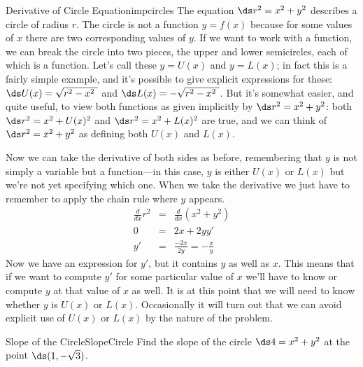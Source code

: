 \begin{example}{Derivative of Circle Equation}{impcircles}
The equation $\ds r^2=x^2+y^2$
describes a circle of radius $r$. The circle is not a function
$y=f(x)$ because for some values of $x$ there are two corresponding
values of $y$. If we want to work with a function, we can break the
circle into two pieces, the upper and lower semicircles, each of which
is a function. Let's call these $y=U(x)$ and $y=L(x)$; in fact this is
a fairly simple example, and it's possible to give explicit
expressions for these: $\ds U(x)=\sqrt{r^2-x^2\ }$ and
$\ds L(x)=-\sqrt{r^2-x^2\ }$.  But it's somewhat easier, and quite useful,
to view both functions as given implicitly by $\ds r^2=x^2+y^2$: both
$\ds r^2=x^2+U(x)^2$ and $\ds r^2=x^2+L(x)^2$ are true, and we can think of 
$\ds r^2=x^2+y^2$ as defining both $U(x)$ and $L(x)$.

Now we can take the derivative of both sides as before, remembering
that $y$ is not simply a variable but a function---in this case, $y$
is either $U(x)$ or $L(x)$ but we're not yet specifying which one.
When we take the derivative we just have to remember to apply the
chain rule where $y$ appears.
\begin{eqnarray*}
\frac{d}{dx}r^2&=&\frac{d}{dx}(x^2+y^2)\\
0&=&2x+2yy'\\
y'&=&\frac{-2x}{2y}=-\frac{x}{y}
\end{eqnarray*}
Now we have an expression for $y'$, but it contains $y$ as well as
$x$. This means that if we want to compute $y'$ for some particular
value of $x$ we'll have to know or compute $y$ at that value of $x$ as
well. It is at this point that we will need to know whether $y$ is
$U(x)$ or $L(x)$. Occasionally it will turn out that we can avoid
explicit use of $U(x)$ or $L(x)$ by the nature of the problem. 
\end{example}

\begin{example}{Slope of the Circle}{SlopeCircle}
Find the slope of the circle $\ds 4=x^2+y^2$ at the point
$\ds (1,-\sqrt{3})$. 
\end{example}

